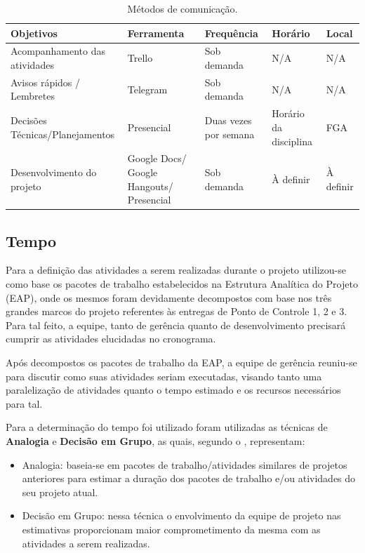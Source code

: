       \begin{table}[!htbp]
      \begin{center}
      \caption{\label{tab:com}Métodos de comunicação.}
      \begin{tabular}{|p{4cm}|p{4cm}|p{3cm}|p{3cm}|p{2cm}|}
      \hline
      \textbf{Objetivos} & \textbf{Ferramenta} & \textbf{Frequência} & \textbf{Horário} & \textbf{Local}\\\hline\hline
      Acompanhamento das atividades & Trello & Sob demanda & N/A & N/A\\\hline
      Avisos rápidos / Lembretes & Telegram & Sob demanda & N/A & N/A\\\hline
      Decisões Técnicas/Planejamentos & Presencial & Duas vezes por semana & Horário da disciplina & FGA\\\hline
      Desenvolvimento do projeto & Google Docs/ Google Hangouts/ Presencial & Sob demanda & À definir & À definir\\\hline
      \end{tabular}
      \end{center}
      \end{table}

    \subsection{Tempo}

      Para a definição das atividades a serem realizadas durante o
      projeto utilizou-se como base os pacotes de trabalho estabelecidos
      na Estrutura Analítica do Projeto (EAP), onde os mesmos foram devidamente
      decompostos com base nos três grandes marcos do projeto referentes
      às entregas de Ponto de Controle 1, 2 e 3. Para tal feito, a equipe,
      tanto de gerência quanto de desenvolvimento precisará cumprir
      as atividades elucidadas no cronograma.

      Após decompostos os pacotes de trabalho da EAP, a equipe
      de gerência reuniu-se para discutir como suas atividades seriam
      executadas, visando tanto uma paralelização de atividades quanto
      o tempo estimado e os recursos necessários para tal.

      Para a determinação do tempo foi utilizado foram utilizadas as
      técnicas de \textbf{Analogia} e \textbf{Decisão em Grupo},
      as quais, segundo o \cite{PMI2012}, representam:

      \begin{itemize}
        \item Analogia: baseia-se em pacotes de trabalho/atividades similares
        de projetos anteriores para estimar a duração dos pacotes de trabalho
        e/ou atividades do seu projeto atual.
        \item Decisão em Grupo: nessa técnica o envolvimento da equipe de projeto
        nas estimativas proporcionam maior comprometimento da mesma com as
        atividades a serem realizadas.
      \end{itemize}

